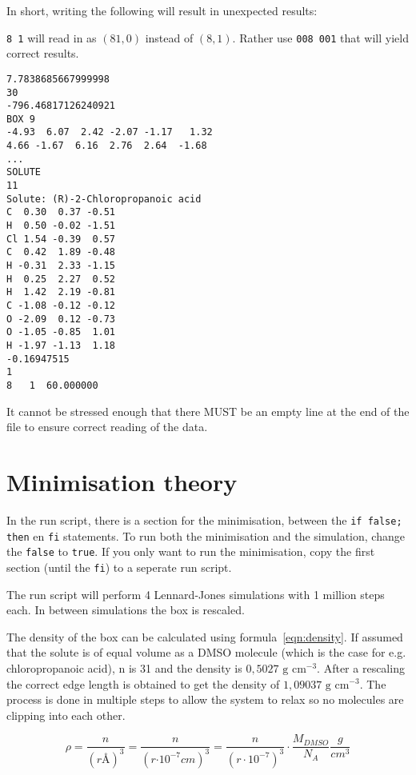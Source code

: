 In short, writing the following will result in unexpected results:

\verb|8 1| will read in as $(81, 0)$ instead of $(8, 1)$. Rather use 
\verb|008 001| that will yield correct results.

\begin{lstlisting}[caption=Example of a correct box-file]
7.7838685667999998     
30
-796.46817126240921     
BOX 9
-4.93  6.07  2.42 -2.07 -1.17   1.32     
4.66 -1.67  6.16  2.76  2.64  -1.68     
...     
SOLUTE
11
Solute: (R)-2-Chloropropanoic acid
C  0.30  0.37 -0.51
H  0.50 -0.02 -1.51
Cl 1.54 -0.39  0.57
C  0.42  1.89 -0.48
H -0.31  2.33 -1.15
H  0.25  2.27  0.52
H  1.42  2.19 -0.81
C -1.08 -0.12 -0.12
O -2.09  0.12 -0.73
O -1.05 -0.85  1.01
H -1.97 -1.13  1.18
-0.16947515     
1
8   1  60.000000

\end{lstlisting}

It cannot be stressed enough that there MUST be an empty line at the end of the 
file to ensure correct reading of the data.

\section{Minimisation theory}
In the run script, there is a section for the minimisation, between the 
\verb|if false; then| en \verb|fi| statements. To run both the minimisation and 
the simulation, change the \verb|false| to \verb|true|. If you only want to run 
the minimisation, copy the first section (until the \verb|fi|) to a seperate 
run script.

The run script will perform 4 Lennard-Jones simulations with 1 million steps 
each. In between simulations the box is rescaled.

The density of the box can be calculated using formula~\ref{eqn:density}. If 
assumed that the solute is of equal volume as a DMSO molecule (which is the 
case for e.g. chloropropanoic acid), n is 31 and the density is $0,5027 
\textrm{ g cm}^{-3}$. After a rescaling the correct edge length is obtained to 
get the density of $1,09037 \textrm{ g cm}^{-3}$.\cite{Radhamma2008}
The process is done in multiple steps to allow the system to relax so no 
molecules are clipping into each other.

\begin{equation} \label{eqn:density}
\rho = \dfrac{n}{(r \si{\angstrom})^3} = \dfrac{n}{(r \si{\cdot 10^{-7} cm})^3} 
=
\dfrac{n}{(r \cdot 10^{-7})^3} \cdot \dfrac{M_{DMSO}}{N_A} \dfrac{g}{cm^3}
\end{equation}

